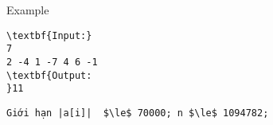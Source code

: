 Example
\begin{verbatim}
\textbf{Input:}
7
2 -4 1 -7 4 6 -1
\textbf{Output:
}11\end{verbatim}
\begin{verbatim}
Giới hạn |a[i]|  $\le$ 70000; n $\le$ 1094782;\end{verbatim}